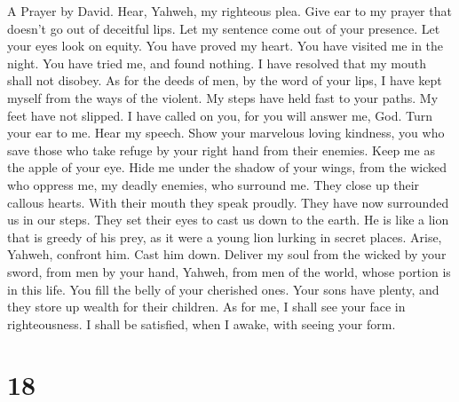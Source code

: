 A Prayer by David.  Hear, Yahweh, my righteous plea. Give
ear to my prayer that doesn't go out of deceitful lips.  Let
my sentence come out of your presence. Let your eyes look on equity.
 You have proved my heart. You have visited me in the night.
You have tried me, and found nothing. I have resolved that my mouth
shall not disobey.  As for the deeds of men, by the word of
your lips, I have kept myself from the ways of the violent. 
My steps have held fast to your paths. My feet have not slipped.
 I have called on you, for you will answer me, God. Turn
your ear to me. Hear my speech.  Show your marvelous loving
kindness, you who save those who take refuge by your right hand from
their enemies.  Keep me as the apple of your eye. Hide me
under the shadow of your wings,  from the wicked who oppress
me, my deadly enemies, who surround me.  They close up
their callous hearts. With their mouth they speak proudly. 
They have now surrounded us in our steps. They set their eyes to cast us
down to the earth.  He is like a lion that is greedy of his
prey, as it were a young lion lurking in secret places. 
Arise, Yahweh, confront him. Cast him down. Deliver my soul from the
wicked by your sword,  from men by your hand, Yahweh, from
men of the world, whose portion is in this life. You fill the belly of
your cherished ones. Your sons have plenty, and they store up wealth for
their children.  As for me, I shall see your face in
righteousness. I shall be satisfied, when I awake, with seeing your
form.

\hypertarget{section-17}{%
\section{18}\label{section-17}}

